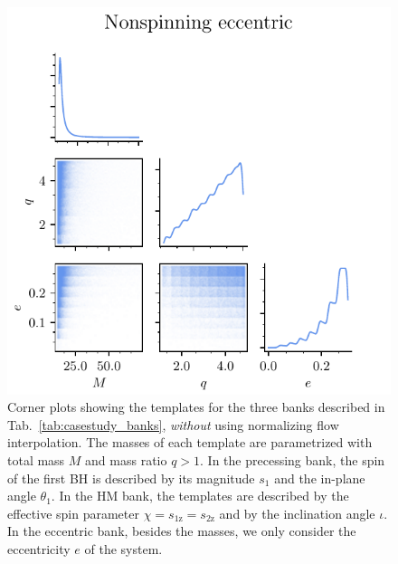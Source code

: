 \documentclass[twocolumn,showpacs,preprintnumbers,nofootinbib,prd,
superscriptaddress,10pt]{revtex4-2}
\begin{document}
\begin{figure}[t]
	\includegraphics[scale = 0.7]{bank_scatter_Nonspinning_eccentric}
	\caption{Corner plots showing the templates for the three banks described in Tab.~\ref{tab:casestudy_banks}, {\it without} using normalizing flow interpolation. The masses of each template are parametrized with total mass $M$ and mass ratio $q>1$. In the precessing bank, the spin of the first BH is described by its magnitude $s_1$ and the in-plane angle $\theta_1$. In the HM bank, the templates are described by the effective spin parameter $\chi = s_\text{1z} = s_\text{2z}$ and by the inclination angle $\iota$. In the eccentric bank, besides the masses, we only consider the eccentricity $e$ of the system.}
	\label{fig:bank_scatter}
\end{figure}
\end{document}
